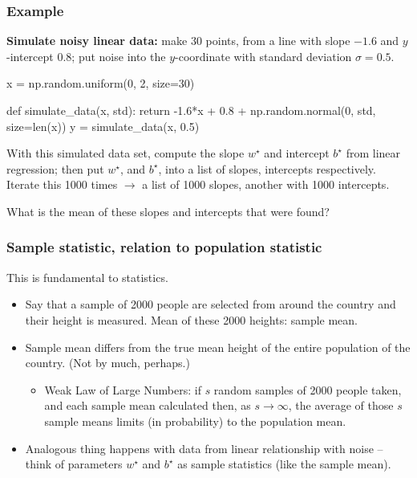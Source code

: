 \documentclass{beamer}
\newenvironment{codeblock}
    {\hfill\begin{beamerboxesrounded}[lower=codecol, width=0.8\textwidth]
    \medskip

    }
    { 
    \end{beamerboxesrounded}\hfill
    }
\theoremstyle{example}
\begin{document}
\begin{frame}[fragile]
\frametitle{Example}
\textbf{Simulate noisy linear data:} make 30 points, from a line with slope $-1.6$ and $y$-intercept $0.8$; put noise into the $y$-coordinate with standard deviation $\sigma = 0.5$. 
\pause

\begin{codeblock}

\begin{python}
x = np.random.uniform(0, 2, size=30)

def simulate_data(x, std):
    return -1.6*x + 0.8 + np.random.normal(0, std, size=len(x))
y = simulate_data(x, 0.5)
\end{python}

\end{codeblock}

\pause
With this simulated data set, compute the slope $w^\star$ and intercept $b^\star$ from linear regression; then put $w^\star$, and $b^\star$, into a list of slopes, intercepts respectively. Iterate this 1000 times $\to$ a list of 1000 slopes, another with 1000 intercepts. 
\vspace*{12pt}

\pause
What is the mean of these slopes and intercepts that were found?

\end{frame}

\begin{frame}
\frametitle{Sample statistic, relation to population statistic}
This is fundamental to statistics. 
\begin{itemize}
    \item Say that a sample of 2000 people are selected from around the country and their height is measured. Mean of these 2000 heights: sample mean.
    \pause
    \item Sample mean differs from the true mean height of the entire population of the country. (Not by much, perhaps.)
    \begin{itemize}
        \item Weak Law of Large Numbers: if $s$ random samples of 2000 people taken, and each sample mean calculated then, as $s\to\infty$, the average of those $s$ sample means limits (in probability) to the population mean.
    \end{itemize}
    \pause
    \item Analogous thing happens with data from linear relationship with noise {--} think of parameters $w^\star$ and $b^\star$ as sample statistics (like the sample mean).
\end{itemize}

\end{frame}
\end{document}
